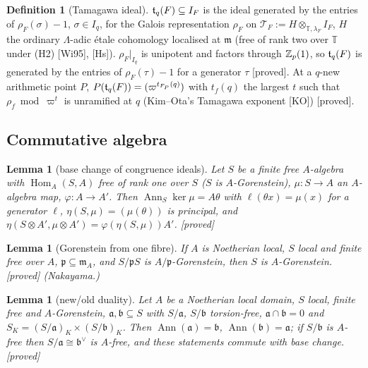 \documentclass[11pt]{amsart}
\theoremstyle{plain}
\newtheorem{lemma}[theorem]{Lemma}
\theoremstyle{definition}
\newtheorem{definition}[theorem]{Definition}
\theoremstyle{remark}
\newcommand{\status}[1]{\textup{\textsf{[#1]}}}
\newcommand{\stproved}{\status{proved}}
\newcommand{\T}{\mathbb{T}}\newcommand{\m}{\mathfrak{m}}\newcommand{\cT}{\mathcal{T}}\newcommand{\cX}{\mathcal{X}}
\newcommand{\fa}{\mathfrak{a}}\newcommand{\fb}{\mathfrak{b}}
\DeclareMathOperator{\Hom}{Hom}\DeclareMathOperator{\coker}{coker}\DeclareMathOperator{\End}{End}
\DeclareMathOperator{\Ann}{Ann}\DeclareMathOperator{\rk}{rk}\DeclareMathOperator{\Stab}{Stab}
\begin{document}
\begin{definition}[Tamagawa ideal]
$\mathfrak{t}_q(F)\subseteq I_F$ is the ideal generated by the entries of $\rho_F(\sigma)-1$, $\sigma\in I_q$, for the Galois representation $\rho_F$ on $\cT_F:=H\otimes_{\T,\lambda_F}I_F$, $H$ the ordinary $\Lambda$-adic étale cohomology localised at $\m$ (free of rank two over $\T$ under (H2) [Wi95], [Hs]). $\rho_F|_{I_q}$ is unipotent and factors through $\mathbb{Z}_p(1)$, so $\mathfrak{t}_q(F)$ is generated by the entries of $\rho_F(\tau)-1$ for a generator $\tau$ \stproved. At a $q$-new arithmetic point $P$, $P(\mathfrak{t}_q(F))=(\varpi^{t_{F_P}(q)})$ with $t_f(q)$ the largest $t$ such that $\rho_f\bmod\varpi^t$ is unramified at $q$ (Kim--Ota's Tamagawa exponent [KO]) \stproved.
\end{definition}

\subsection{Commutative algebra}
\begin{lemma}[base change of congruence ideals]\label{lem:S}
Let $S$ be a finite free $A$-algebra with $\Hom_A(S,A)$ free of rank one over $S$ ($S$ is $A$-Gorenstein), $\mu:S\to A$ an $A$-algebra map, $\varphi:A\to A'$. Then $\Ann_S\ker\mu=A\theta$ with $\ell(\theta x)=\mu(x)$ for a generator $\ell$, $\eta(S,\mu)=(\mu(\theta))$ is principal, and $\eta(S\otimes A',\mu\otimes A')=\varphi(\eta(S,\mu))A'$. \stproved
\end{lemma}
\begin{lemma}[Gorenstein from one fibre]\label{lem:G}
If $A$ is Noetherian local, $S$ local and finite free over $A$, $\mathfrak p\subseteq\m_A$, and $S/\mathfrak pS$ is $A/\mathfrak p$-Gorenstein, then $S$ is $A$-Gorenstein. \stproved{} (Nakayama.)
\end{lemma}
\begin{lemma}[new/old duality]\label{lem:D}
Let $A$ be a Noetherian local domain, $S$ local, finite free and $A$-Gorenstein, $\fa,\fb\subseteq S$ with $S/\fa$, $S/\fb$ torsion-free, $\fa\cap\fb=0$ and $S_K=(S/\fa)_K\times(S/\fb)_K$. Then $\Ann(\fa)=\fb$, $\Ann(\fb)=\fa$; if $S/\fb$ is $A$-free then $S/\fa\cong\fb^\vee$ is $A$-free, and these statements commute with base change. \stproved
\end{lemma}
\end{document}
